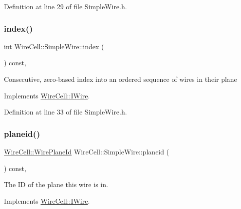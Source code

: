 Definition at line 29 of file Simple\+Wire.\+h.

\mbox{\label{class_wire_cell_1_1_simple_wire_a30b573d4e30069df22532b79b72d084f}} 
\subsubsection{\texorpdfstring{index()}{index()}}
{\footnotesize\ttfamily int Wire\+Cell\+::\+Simple\+Wire\+::index (\begin{DoxyParamCaption}{ }\end{DoxyParamCaption}) const\hspace{0.3cm}{\ttfamily [inline]}, {\ttfamily [virtual]}}

Consecutive, zero-\/based index into an ordered sequence of wires in their plane 

Implements \hyperlink{class_wire_cell_1_1_i_wire_abe81fe1d38c3d0a73e812e765f2081cd}{Wire\+Cell\+::\+I\+Wire}.



Definition at line 33 of file Simple\+Wire.\+h.

\mbox{\label{class_wire_cell_1_1_simple_wire_a73c7459a542146db971644530f8f8d0d}} 
\subsubsection{\texorpdfstring{planeid()}{planeid()}}
{\footnotesize\ttfamily \hyperlink{class_wire_cell_1_1_wire_plane_id}{Wire\+Cell\+::\+Wire\+Plane\+Id} Wire\+Cell\+::\+Simple\+Wire\+::planeid (\begin{DoxyParamCaption}{ }\end{DoxyParamCaption}) const\hspace{0.3cm}{\ttfamily [inline]}, {\ttfamily [virtual]}}



The ID of the plane this wire is in. 



Implements \hyperlink{class_wire_cell_1_1_i_wire_ac1be702dac05d5298f7cf20a5fda910b}{Wire\+Cell\+::\+I\+Wire}.



